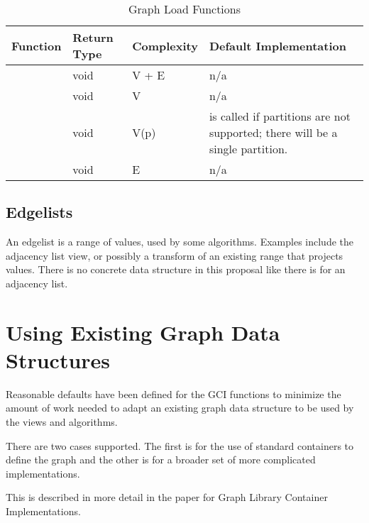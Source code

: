 \begin{table}[h!]
\begin{center}
\resizebox{\textwidth}{!}
{\begin{tabular}{l l p{1.5cm} L{7.0cm}}
\hline
    \textbf{Function} & \textbf{Return Type} & \textbf{Complexity} & \textbf{Default Implementation} \\
\hline
     & void & V + E & n/a \\
     & void & V & n/a \\
     & void & V(p) &  is called if partitions are not supported; there will be a single partition. \\
     & void & E & n/a \\
\hline
\end{tabular}}
\caption{Graph Load Functions}
\label{tab:load_func}
\end{center}
\end{table}

\subsection{Edgelists}
An edgelist is a range of  values, used by some algorithms. Examples include the  adjacency 
list view, or possibly a transform of an existing range that projects  values. There is no concrete data
structure in this proposal like there is for an adjacency list.

\section{Using Existing Graph Data Structures}
Reasonable defaults have been defined for the GCI functions to minimize the amount of work
needed to adapt an existing graph data structure to be used by the views and algorithms.

There are two cases supported. The first is for the use of standard containers to define the graph and the other
is for a broader set of more complicated implementations.

This is described in more detail in the paper for Graph Library Container Implementations.
